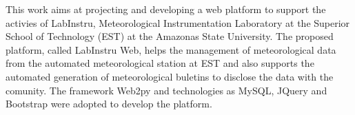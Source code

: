 This work aims at projecting and developing a web platform to support the activies of LabInstru, Meteorological Instrumentation Laboratory at the Superior School of Technology (EST) at the Amazonas State University. The proposed platform, called LabInstru Web, helps the management of meteorological data from the automated meteorological station at EST and also supports the automated generation of meteorological buletins to disclose the data with the comunity. The framework Web2py and technologies as MySQL, JQuery and Bootstrap were adopted to develop the platform.